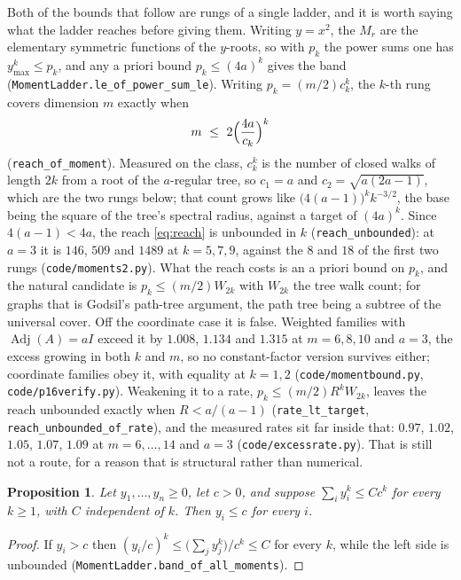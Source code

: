 \documentclass[11pt]{article}
\newtheorem{proposition}[theorem]{Proposition}
\theoremstyle{remark}
\begin{document}
Both of the bounds that follow are rungs of a single ladder, and it is worth saying what the
ladder reaches before giving them. Writing $y=x^2$, the $M_r$ are the elementary symmetric
functions of the $y$-roots, so with $p_k$ the power sums one has $y_{\max}^k\le p_k$, and any
a priori bound $p_k\le(4a)^k$ gives the band (\texttt{MomentLadder.le\_of\_power\_sum\_le}).
Writing $p_k=(m/2)c_k^k$, the $k$-th rung covers dimension $m$ exactly when
\begin{equation}\label{eq:reach}
   m\ \le\ 2\Bigl(\frac{4a}{c_k}\Bigr)^{k}
\end{equation}
(\texttt{reach\_of\_moment}). Measured on the class, $c_k^k$ is the number of closed walks of
length $2k$ from a root of the $a$-regular tree, so $c_1=a$ and $c_2=\sqrt{a(2a-1)}$, which are
the two rungs below; that count grows like $\bigl(4(a-1)\bigr)^kk^{-3/2}$, the base being the
square of the tree's spectral radius, against a target of $(4a)^k$. Since $4(a-1)<4a$, the reach
\eqref{eq:reach} is unbounded in $k$ (\texttt{reach\_unbounded}): at $a=3$ it is $146$, $509$ and
$1489$ at $k=5,7,9$, against the $8$ and $18$ of the first two rungs (\texttt{code/moments2.py}).
What the reach costs is an a priori bound on $p_k$, and the natural candidate is
$p_k\le(m/2)W_{2k}$ with $W_{2k}$ the tree walk count; for graphs that is Godsil's path-tree
argument, the path tree being a subtree of the universal cover. Off the coordinate case it is
false. Weighted families with $\operatorname{Adj}(A)=aI$ exceed it by $1.008$, $1.134$ and
$1.315$ at $m=6,8,10$ and $a=3$, the excess growing in both $k$ and $m$, so no constant-factor
version survives either; coordinate families obey it, with equality at $k=1,2$
(\texttt{code/momentbound.py}, \texttt{code/p16verify.py}). Weakening it to a rate,
$p_k\le(m/2)R^kW_{2k}$, leaves the reach unbounded exactly when $R<a/(a-1)$
(\texttt{rate\_lt\_target}, \texttt{reach\_unbounded\_of\_rate}), and the measured rates sit far
inside that: $0.97$, $1.02$, $1.05$, $1.07$, $1.09$ at $m=6,\dots,14$ and $a=3$
(\texttt{code/excessrate.py}). That is still not a route, for a reason that is structural rather
than numerical.

\begin{proposition}\label{prop:ladder-nogo}
Let $y_1,\dots,y_n\ge0$, let $c>0$, and suppose $\sum_iy_i^k\le Cc^k$ for every $k\ge1$, with
$C$ independent of $k$. Then $y_i\le c$ for every $i$.
\end{proposition}

\begin{proof}
If $y_i>c$ then $(y_i/c)^k\le\bigl(\sum_jy_j^k\bigr)/c^k\le C$ for every $k$, while the left
side is unbounded \textup{(}\texttt{MomentLadder.band\_of\_all\_moments}\textup{)}.
\end{proof}
\end{document}

